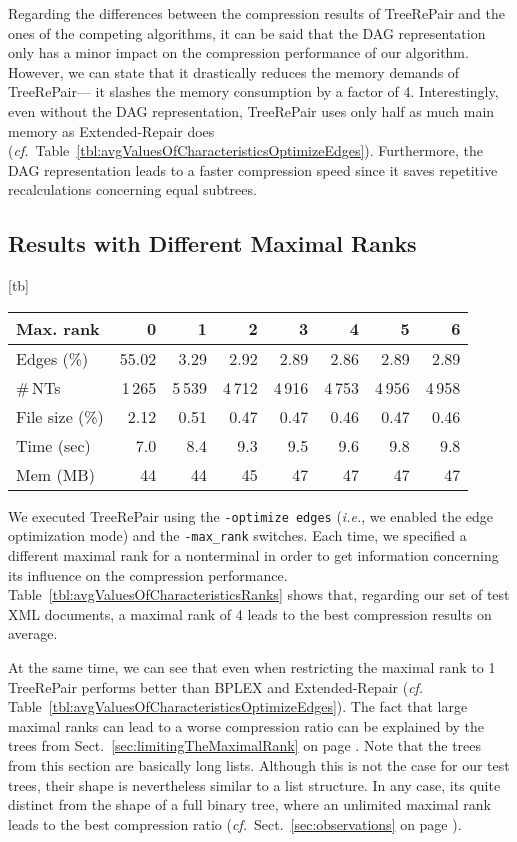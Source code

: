 \documentclass[12pt]{llncs}
\makeatletter
\renewenvironment{table}
               {\setlength\abovecaptionskip{10\p@}\setlength\belowcaptionskip{10\p@}\@float{table}}
               {\end@float}
\newcommand{\trp}{\mbox{TreeRePair}\xspace}
\newcommand{\hairsp}{\hspace{1pt}}\newcommand{\TODO}{\textcolor{red}{\bf TODO!}\xspace}
\newcommand{\ie}{\mbox{\textit{i.\hairsp{}e.}}\xspace}
\newcommand{\cf}{\textit{cf.}~}
\makeatother
\begin{document}
Regarding the differences between the compression results of \trp and the ones of the competing algorithms, it can be said that the DAG representation only has a minor impact on the compression performance of our algorithm. However, we can state that it drastically reduces the memory demands of \trp\space--- it slashes the memory consumption by a factor of 4. Interestingly, even without the DAG representation, \trp uses only half as much main memory as Extended-Repair does (\cf Table~\ref{tbl:avgValuesOfCharacteristicsOptimizeEdges}). Furthermore, the DAG representation leads to a faster compression speed since it saves repetitive recalculations concerning equal subtrees.

\subsection{Results with Different Maximal Ranks}\label{sec:resultsWithDifferentMaximalRanks}

\begin{table}[tb]
	\centering\small
	\begin{tabular}{lrrrrrrr}
		\toprule
		Max. rank&0&1&2&3&4&5&6\\
		\midrule
		Edges (\%)&55.02&3.29&2.92&2.89&2.86&2.89&2.89\\
		\#\,NTs&1\,265&5\,539&4\,712&4\,916&4\,753&4\,956&4\,958\\
		File size (\%)&2.12&0.51&0.47&0.47&0.46&0.47&0.46\\
		Time (sec)&7.0&8.4&9.3&9.5&9.6&9.8&9.8\\
		Mem (MB)&44&44&45&47&47&47&47\\
		\bottomrule
	\end{tabular}
	\caption{Average values of the characteristics of the runs of \trp with different maximal ranks allowed for a nonterminal.}\label{tbl:avgValuesOfCharacteristicsRanks}
\end{table}

We executed TreeRePair using the \texttt{-optimize edges} (\ie, we
enabled the edge optimization mode) and the \texttt{-max\_rank}
switches. Each time, we specified a different maximal rank for a
nonterminal in order to get information concerning its influence on 
the compression performance. Table~\ref{tbl:avgValuesOfCharacteristicsRanks} shows that, regarding our
set of test XML documents, a maximal rank 
of 4 leads to the best compression results on average. 

At the same time, we can see that even when restricting the maximal
rank to 1 \trp performs better than BPLEX and Extended-Repair (\cf
Table~\ref{tbl:avgValuesOfCharacteristicsOptimizeEdges}). The fact
that large maximal ranks can lead to a worse compression ratio can be
explained by the trees from Sect.~\ref{sec:limitingTheMaximalRank} on
page \pageref{sec:limitingTheMaximalRank}. Note that the trees from
this section are basically long lists. Although this is not the case
for our test trees, their shape is nevertheless similar to a list
structure. In any case, its quite distinct from the shape of a full
binary tree, where an unlimited maximal rank leads to 
the best compression ratio (\cf Sect.~\ref{sec:observations} on page \pageref{sec:observations}).
\end{document}
